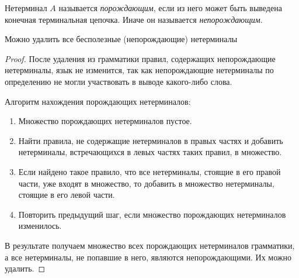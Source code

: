 \begin{definition}
Нетерминал $A$ называется \textit{порождающим}, если из него может быть выведена конечная терминальная цепочка. Иначе он называется \textit{непорождающим}.
\end{definition}

\begin{lemma}
  Можно удалить все бесполезные (непорождающие) нетерминалы
\end{lemma}

\begin{proof}
  После удаления из грамматики правил, содержащих непорождающие нетерминалы, язык не изменится, так как непорождающие нетерминалы по определению не могли участвовать в выводе какого-либо слова.

  Алгоритм нахождения порождающих нетерминалов:
  \begin{enumerate}
  \item Множество порождающих нетерминалов пустое.
  \item Найти правила, не содержащие нетерминалов в правых частях и добавить нетерминалы, встречающихся в левых частях таких правил, в множество.
  \item Если найдено такое правило, что все нетерминалы, стоящие в его правой части, уже входят в множество, то добавить в множество нетерминалы, стоящие в его левой части.
  \item Повторить предыдущий шаг, если множество порождающих нетерминалов изменилось.
\end{enumerate}
В результате получаем множество всех порождающих нетерминалов грамматики, а все нетерминалы, не попавшие в него, являются непорождающими. Их можно удалить.
\end{proof}

